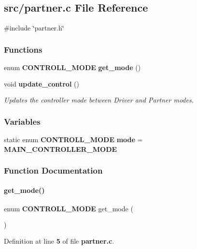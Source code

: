 \subsection{src/partner.c File Reference}
\label{partner_8c}
{\ttfamily \#include \char`\"{}partner.\+h\char`\"{}}\newline
\subsubsection*{Functions}
\begin{DoxyCompactItemize}
\item 
enum \textbf{ C\+O\+N\+T\+R\+O\+L\+L\+\_\+\+M\+O\+DE} \textbf{ get\+\_\+mode} ()
\item 
void \textbf{ update\+\_\+control} ()
\begin{DoxyCompactList}\small\item\em Updates the controller mode between Driver and Partner modes. \end{DoxyCompactList}\end{DoxyCompactItemize}
\subsubsection*{Variables}
\begin{DoxyCompactItemize}
\item 
static enum \textbf{ C\+O\+N\+T\+R\+O\+L\+L\+\_\+\+M\+O\+DE} \textbf{ mode} = \textbf{ M\+A\+I\+N\+\_\+\+C\+O\+N\+T\+R\+O\+L\+L\+E\+R\+\_\+\+M\+O\+DE}
\end{DoxyCompactItemize}


\subsubsection{Function Documentation}
\mbox{\label{partner_8c_aacc86d07e59d3b919f5c5eae2ce5d404}} 
\paragraph{get\+\_\+mode()}
{\footnotesize\ttfamily enum \textbf{ C\+O\+N\+T\+R\+O\+L\+L\+\_\+\+M\+O\+DE} get\+\_\+mode (\begin{DoxyParamCaption}{ }\end{DoxyParamCaption})}



Definition at line \textbf{ 5} of file \textbf{ partner.\+c}.



